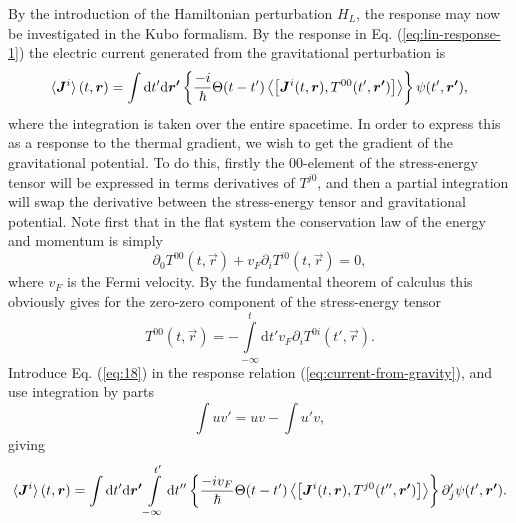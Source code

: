 By the introduction of the Hamiltonian perturbation $H_L$, the response may now be investigated in the Kubo formalism.
By the response in Eq. (\ref{eq:lin-response-1}) the electric current generated from the gravitational perturbation is
\begin{equation}
  \label{eq:current-from-gravity}
  \braket{\bm{J}^i}(t, \bm{r}) =
\int \mathrm{d}t' \mathrm{d} \bm{r'} \left\{
  \frac{-i}{\hbar} \Theta(t-t') \Braket{\left[
\bm{J}^i(t, \bm{r}), T^{00}(t', \bm{r'})
    \right]}
\right\} 
\psi (t', \bm{r'}),
\end{equation}
where the integration is taken over the entire spacetime.
In order to express this as a response to the thermal gradient, we wish to get the gradient of the gravitational potential.
To do this, firstly the $00$-element of the stress-energy tensor will be expressed in terms derivatives of $T^{j0}$, and then a partial integration will swap the derivative between the stress-energy tensor and gravitational potential.
Note first that in the flat system the conservation law of the  energy and momentum is simply
\begin{equation}
  \partial _0 T^{00}(t, \vec{r}) + v_F \partial _i T^{i0} (t, \vec{r}) = 0,
\end{equation}
where $v_F$ is the Fermi velocity.
By the fundamental theorem of calculus this obviously gives for the zero-zero component of the stress-energy tensor
\begin{equation}
  \label{eq:18}
  T^{00}(t, \vec{r}) = - \int\limits_{-\infty }^t \mathrm{d}t'
  v_F \partial _i T^{0i}(t', \vec{r}).
\end{equation}
Introduce Eq. (\ref{eq:18}) in the response relation (\ref{eq:current-from-gravity}), and use integration by parts
\begin{equation}
  \int u v' = uv - \int u' v,
\end{equation}
giving
\begin{equation}\label{eq:current-luttinger-gravity-final}
  \braket{\bm{J}^i}(t, \bm{r}) =
  \int \mathrm{d}t' \mathrm{d} \bm{r'}
  \int\limits_{-\infty }^{t'} \mathrm{d}t''
  \left\{
    \frac{-i v_{F}}{\hbar} \Theta(t-t') \Braket{\left[
        \bm{J}^i(t, \bm{r}), T^{j0}(t'', \bm{r'})
      \right]}
  \right\} 
  \partial'_j \psi (t', \bm{r'}).
\end{equation}
